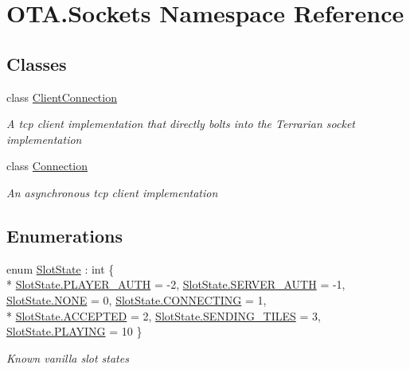 \hypertarget{namespace_o_t_a_1_1_sockets}{}\section{O\+T\+A.\+Sockets Namespace Reference}
\label{namespace_o_t_a_1_1_sockets}
\subsection*{Classes}
\begin{DoxyCompactItemize}
\item 
class \hyperlink{class_o_t_a_1_1_sockets_1_1_client_connection}{Client\+Connection}
\begin{DoxyCompactList}\small\item\em A tcp client implementation that directly bolts into the Terrarian socket implementation \end{DoxyCompactList}\item 
class \hyperlink{class_o_t_a_1_1_sockets_1_1_connection}{Connection}
\begin{DoxyCompactList}\small\item\em An asynchronous tcp client implementation \end{DoxyCompactList}\end{DoxyCompactItemize}
\subsection*{Enumerations}
\begin{DoxyCompactItemize}
\item 
enum \hyperlink{namespace_o_t_a_1_1_sockets_a716a4cdcbec05bdeb647942d47724ce8}{Slot\+State} \+: int \{ \\*
\hyperlink{namespace_o_t_a_1_1_sockets_a716a4cdcbec05bdeb647942d47724ce8a93dd5a77b688ef34fcb26469278c13b1}{Slot\+State.\+P\+L\+A\+Y\+E\+R\+\_\+\+A\+U\+T\+H} = -\/2, 
\hyperlink{namespace_o_t_a_1_1_sockets_a716a4cdcbec05bdeb647942d47724ce8a0cefceee4b791ca19d9e0dabcb8441fe}{Slot\+State.\+S\+E\+R\+V\+E\+R\+\_\+\+A\+U\+T\+H} = -\/1, 
\hyperlink{namespace_o_t_a_1_1_sockets_a716a4cdcbec05bdeb647942d47724ce8ab50339a10e1de285ac99d4c3990b8693}{Slot\+State.\+N\+O\+N\+E} = 0, 
\hyperlink{namespace_o_t_a_1_1_sockets_a716a4cdcbec05bdeb647942d47724ce8a9a14f95e151eec641316e7c784ce832d}{Slot\+State.\+C\+O\+N\+N\+E\+C\+T\+I\+N\+G} = 1, 
\\*
\hyperlink{namespace_o_t_a_1_1_sockets_a716a4cdcbec05bdeb647942d47724ce8aa806f1d2c42338ef5fa6497b66153e79}{Slot\+State.\+A\+C\+C\+E\+P\+T\+E\+D} = 2, 
\hyperlink{namespace_o_t_a_1_1_sockets_a716a4cdcbec05bdeb647942d47724ce8a547018cad1e3b450cff8b5348b78c4da}{Slot\+State.\+S\+E\+N\+D\+I\+N\+G\+\_\+\+T\+I\+L\+E\+S} = 3, 
\hyperlink{namespace_o_t_a_1_1_sockets_a716a4cdcbec05bdeb647942d47724ce8a50366a49630a416ab3ccaa004196027e}{Slot\+State.\+P\+L\+A\+Y\+I\+N\+G} = 10
 \}\begin{DoxyCompactList}\small\item\em Known vanilla slot states \end{DoxyCompactList}
\end{DoxyCompactItemize}


